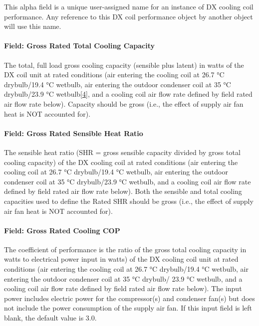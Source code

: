 This alpha field is a unique user-assigned name for an instance of DX cooling coil performance. Any reference to this DX coil performance object by another object will use this name.

\paragraph{Field: Gross Rated Total Cooling Capacity}\label{field-gross-rated-total-cooling-capacity-2}

The total, full load gross cooling capacity (sensible plus latent) in watts of the DX coil unit at rated conditions (air entering the cooling coil at 26.7 °C drybulb/19.4 °C wetbulb, air entering the outdoor condenser coil at 35 °C drybulb/23.9 °C wetbulb\protect\hyperlink{ux5fftn4}{{[}4{]}}, and a cooling coil air flow rate defined by field rated air flow rate below). Capacity should be gross (i.e., the effect of supply air fan heat is NOT accounted for).

\paragraph{Field: Gross Rated Sensible Heat Ratio}\label{field-gross-rated-sensible-heat-ratio-1}

The sensible heat ratio (SHR = gross sensible capacity divided by gross total cooling capacity) of the DX cooling coil at rated conditions (air entering the cooling coil at 26.7 °C drybulb/19.4 °C wetbulb, air entering the outdoor condenser coil at 35 °C drybulb/23.9 °C wetbulb, and a cooling coil air flow rate defined by field rated air flow rate below). Both the sensible and total cooling capacities used to define the Rated SHR should be gross (i.e., the effect of supply air fan heat is NOT accounted for).

\paragraph{Field: Gross Rated Cooling COP}\label{field-gross-rated-cooling-cop-1}

The coefficient of performance is the ratio of the gross total cooling capacity in watts to electrical power input in watts) of the DX cooling coil unit at rated conditions (air entering the cooling coil at 26.7 °C drybulb/19.4 °C wetbulb, air entering the outdoor condenser coil at 35 °C drybulb/ 23.9 °C wetbulb, and a cooling coil air flow rate defined by field rated air flow rate below). The input power includes electric power for the compressor(s) and condenser fan(s) but does not include the power consumption of the supply air fan. If this input field is left blank, the default value is 3.0.

